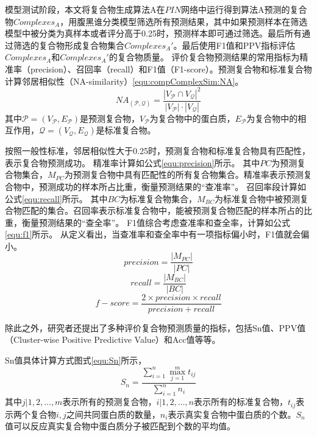 模型测试阶段，本文将复合物生成算法A在$PIN$网络中运行得到算法A预测的复合物$Complexes_A$，用腹黑谁分类模型筛选所有预测结果，其中如果预测样本在筛选模型中被分类为真样本或者评分高于0.25时，预测样本即可通过筛选。最后所有通过筛选的复合物形成复合物集合$Complexes_A'$。最后使用F1值和PPV指标评估$Complexes_A$和$Complexes_A'$的复合物质量。
评价复合物预测结果的常用指标为精准率（precision）、召回率（recall）和F1值（F1-score）。预测复合物和标准复合物计算邻居相似性（NA-similarity）\ref{equ:compComplexSim:NA}。
\begin{equation}
    \label{equ:compComplexSim:NA}
    NA_{(\mathcal{P} ,\mathcal{Q} )} = \frac{{\left\lvert V_{\mathcal{P}} \cap V_{\mathcal{Q}}\right\rvert}^2 }{{\left\lvert V_{\mathcal{P}} \right\rvert}\cdot  {\left\lvert V_{\mathcal{Q}} \right\rvert}}
\end{equation}
其中$\mathcal{P}=(V_{\mathcal{P}} ,E_{\mathcal{P}})$是预测复合物，$V_{\mathcal{P}}$为复合物中的蛋白质，$E_{\mathcal{P}}$为复合物中的相互作用，$\mathcal{Q}=(V_{\mathcal{Q}} ,E_{\mathcal{Q}})$是标准复合物。

按照一般性标准，邻居相似性大于0.25时，预测复合物和标准复合物具有匹配性，表示复合物预测成功。
精准率计算如公式\ref{equ:precision}所示。
其中$PC$为预测复合物集合，$M_{PC}$为预测复合物中具有匹配性的所有复合物集合。精准率表示预测复合物中，预测成功的样本所占比重，衡量预测结果的“查准率”。
召回率段计算如公式\ref{equ:recall}所示。
其中$BC$为标准复合物集合，$M_{BC}$为标准复合物中被预测复合物匹配的集合。召回率表示标准复合物中，能被预测复合物匹配的样本所占的比重，衡量预测结果的“查全率”。
F1值综合考虑查准率和查全率，计算如公式\ref{equ:f1}所示。
从定义看出，当查准率和查全率中有一项指标偏小时，F1值就会偏小。
\begin{equation}
    \label{equ:precision}
    precision=\frac{\left\lvert M_{PC}\right\rvert }{\left\lvert PC\right\rvert }
\end{equation}
\begin{equation}
    \label{equ:recall}
    recall=\frac{\left\lvert M_{BC}\right\rvert }{\left\lvert BC\right\rvert }
\end{equation}
\begin{equation}
    \label{equ:f1}
    f-score=\frac{2\times precision\times recall}{precision + recall }
\end{equation}

除此之外，研究者还提出了多种评价复合物预测质量的指标\cite{shi_protein_2011}，包括Sn值、PPV值（Cluster-wise Positive Predictive Value）和Acc值等等。

Sn值具体计算方式图式\ref{equ:Sn}所示，
\begin{equation}
    \label{equ:Sn}
    S_n=\frac{\sum_{i = 1}^{n} \max_{j=1}^{m} t_{ij}}{\sum_{i = 1}^{n}n_i}
\end{equation}
其中${j| 1,2,\dots,m }$表示所有的预测复合物，${i| 1,2,\dots,n }$表示所有的标准复合物，$t_{ij}$表示两个复合物$i,j$之间共同蛋白质的数量，$n_i$表示真实复合物中蛋白质的个数。$S_n$值可以反应真实复合物中蛋白质分子被匹配到个数的平均值。


